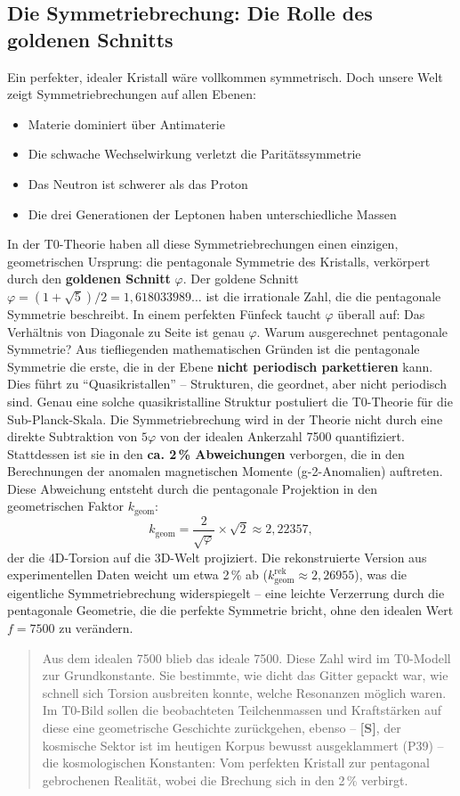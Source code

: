 	\subsection{Die Symmetriebrechung: Die Rolle des goldenen Schnitts}
	Ein perfekter, idealer Kristall wäre vollkommen symmetrisch. Doch unsere Welt zeigt Symmetriebrechungen auf allen Ebenen:
	\begin{itemize}
		\item Materie dominiert über Antimaterie
		\item Die schwache Wechselwirkung verletzt die Paritätssymmetrie
		\item Das Neutron ist schwerer als das Proton
		\item Die drei Generationen der Leptonen haben unterschiedliche Massen
	\end{itemize}
	In der T0-Theorie haben all diese Symmetriebrechungen einen einzigen, geometrischen Ursprung: die pentagonale Symmetrie des Kristalls, verkörpert durch den \textbf{goldenen Schnitt} \(\varphi\).
	Der goldene Schnitt \(\varphi = (1+\sqrt{5})/2 = 1{,}618033989\ldots\) ist die irrationale Zahl, die die pentagonale Symmetrie beschreibt. In einem perfekten Fünfeck taucht \(\varphi\) überall auf: Das Verhältnis von Diagonale zu Seite ist genau \(\varphi\).
	Warum ausgerechnet pentagonale Symmetrie? Aus tiefliegenden mathematischen Gründen ist die pentagonale Symmetrie die erste, die in der Ebene \textbf{nicht periodisch parkettieren} kann. Dies führt zu \enquote{Quasikristallen} -- Strukturen, die geordnet, aber nicht periodisch sind. Genau eine solche quasikristalline Struktur postuliert die T0-Theorie für die Sub-Planck-Skala.
	Die Symmetriebrechung wird in der Theorie nicht durch eine direkte Subtraktion von \(5\varphi\) von der idealen Ankerzahl 7500 quantifiziert. Stattdessen ist sie in den \textbf{ca. 2\,\% Abweichungen} verborgen, die in den Berechnungen der anomalen magnetischen Momente (g-2-Anomalien) auftreten. Diese Abweichung entsteht durch die pentagonale Projektion in den geometrischen Faktor \(k_\text{geom}\):
	\begin{equation}
		k_\text{geom} = \frac{2}{\sqrt{\varphi}} \times \sqrt{2} \approx 2{,}22357,
	\end{equation}
	der die 4D-Torsion auf die 3D-Welt projiziert. Die rekonstruierte Version aus experimentellen Daten weicht um etwa 2\,\% ab (\(k_\text{geom}^\text{rek} \approx 2{,}26955\)), was die eigentliche Symmetriebrechung widerspiegelt -- eine leichte Verzerrung durch die pentagonale Geometrie, die die perfekte Symmetrie bricht, ohne den idealen Wert \(f = 7500\) zu verändern.
	\begin{quotation}
		Aus dem idealen 7500 blieb das ideale 7500. Diese Zahl wird im T0-Modell zur Grundkonstante. Sie bestimmte, wie dicht das Gitter gepackt war, wie schnell sich Torsion ausbreiten konnte, welche Resonanzen möglich waren.
		Im T0-Bild sollen die beobachteten Teilchenmassen und Kraftstärken auf diese eine geometrische Geschichte zurückgehen, ebenso -- \textbf{[S]}, der kosmische Sektor ist im heutigen Korpus bewusst ausgeklammert (P39) -- die kosmologischen Konstanten: Vom perfekten Kristall zur pentagonal gebrochenen Realität, wobei die Brechung sich in den 2\,\% verbirgt.
	\end{quotation}
	
